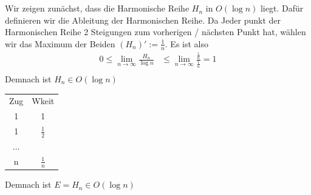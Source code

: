 \documentclass{article}
\begin{document}
    \maketitle
    \section{}
    Wir zeigen zunächst, dass die Harmonische
    Reihe $H_n$ in $O(\log n)$ liegt.
    Dafür definieren wir die Ableitung der Harmonischen
    Reihe. Da Jeder punkt der Harmonischen Reihe
    2 Steigungen zum vorherigen / nächsten Punkt hat,
    wählen wir das Maximum der Beiden $(H_n)':=\frac{1}{n}$.
    Es ist also
    \begin{align*}
        0\leq\lim\limits_{n\rightarrow\infty}
        \frac{H_n}{\log n}&\leq
        \lim\limits_{n\rightarrow\infty}
        \frac{\frac{1}{n}}{\frac{1}{n}}=1\\
    \end{align*}
    Demnach ist $H_n\in O(\log n)$

    \begin{tabular}{cc}
        Zug&Wkeit\\
        1&1\\
        1&$\frac{1}{2}$\\
        $\hdots$\\
        n&$\frac{1}{n}$
    \end{tabular}

    Demnach ist $E=H_n\in O(\log n)$
\end{document}
